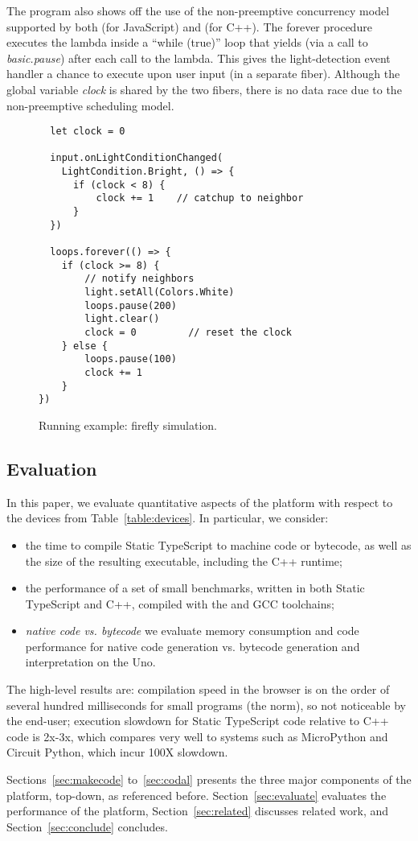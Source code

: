 The program also shows off the use of the non-preemptive concurrency
model supported by both \MC (for JavaScript) and \CO (for C++).
The forever procedure executes the lambda inside a ``while (true)''
loop that yields (via a call to \emph{basic.pause}) after each call to the lambda.
This gives the light-detection event handler a chance to execute
upon user input (in a separate fiber). Although the global variable \emph{clock} is
shared by the two fibers, there is no data race due to the non-preemptive
scheduling model.

\begin{figure}
\begin{lstlisting}
  let clock = 0

  input.onLightConditionChanged(
    LightCondition.Bright, () => {
      if (clock < 8) {
          clock += 1    // catchup to neighbor
      }
  })

  loops.forever(() => {
    if (clock >= 8) {
        // notify neighbors
        light.setAll(Colors.White)
        loops.pause(200)
        light.clear()
        clock = 0         // reset the clock
    } else {
        loops.pause(100)
        clock += 1
    }
})
\end{lstlisting}
\caption{\label{fig:example}Running example: firefly simulation.}
\end{figure}


\subsection{Evaluation}

In this paper, we evaluate quantitative aspects of the platform
with respect to the devices from Table~\ref{table:devices}. In particular, we
consider:
\begin{itemize}
\item the time to compile Static TypeScript to machine code or bytecode,
       as well as the size of the resulting executable, including the C++ runtime;
\item the performance of a set of small benchmarks, written in both Static TypeScript and C++,
      compiled with the \MC and GCC toolchains;
\item \emph{native code vs. bytecode} we
     evaluate memory consumption and code performance for native code generation
     vs. bytecode generation and interpretation on the Uno.
\end{itemize}
The high-level results are: compilation speed in the browser is on the order
of several hundred milliseconds for small programs (the norm), so not noticeable
by the end-user; execution slowdown for Static TypeScript code relative to C++
code is 2x-3x, which compares very well to systems such as MicroPython and
Circuit Python, which incur 100X slowdown.

Sections~\ref{sec:makecode} to~\ref{sec:codal} presents the three major components of the platform, top-down,
as referenced before. Section~\ref{sec:evaluate} evaluates the performance of the platform,
Section~\ref{sec:related} discusses related work, and Section~\ref{sec:conclude}
concludes.
